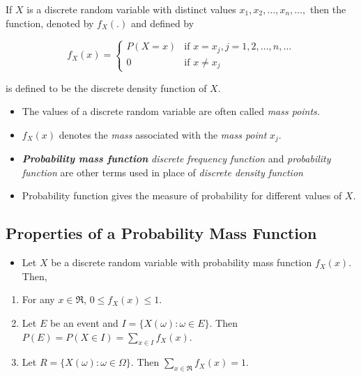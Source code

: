 \documentclass[]{book}
\providecommand{\tightlist}{%
  \setlength{\itemsep}{0pt}\setlength{\parskip}{0pt}}
\begin{document}
If \(X\) is a discrete random variable with distinct values \(x_1, x_2, \dots, x_n, \dots,\) then the function, denoted by \(f_X(.)\) and defined by

\begin{equation}
f_X(x) =
\begin{cases} 
P(X=x) & \text{if } x=x_j, j=1,2,\dots,n,\dots\\
0 & \text{if } x \neq x_j
\end{cases}
\end{equation}

is defined to be the discrete density function of \(X\).

\begin{itemize}
\tightlist
\item
  The values of a discrete random variable are often called \emph{mass points.}
\item
  \(f_X(x)\) denotes the \emph{mass} associated with the \emph{mass point} \(x_j\).
\item
  \textbf{\emph{Probability mass function}} \emph{discrete frequency function} and \emph{probability function} are other terms used in place of \emph{discrete density function}
\item
  Probability function gives the measure of probability for different values of \(X\).
\end{itemize}

\hypertarget{properties-of-a-probability-mass-function}{%
\subsection{Properties of a Probability Mass Function}\label{properties-of-a-probability-mass-function}}

\begin{itemize}
\tightlist
\item
  Let \(X\) be a discrete random variable with probability mass function \(f_X(x)\). Then,
\end{itemize}

\begin{enumerate}
\def\labelenumi{\arabic{enumi}.}
\tightlist
\item
  For any \(x\in \Re\), \(0\leq f_X(x) \leq 1.\)
\item
  Let \(E\) be an event and \(I= \{X(\omega):\omega \in E\}.\) Then \(P(E) = P(X\in I) = \sum_{x \in I}f_X(x).\)
\item
  Let \(R = \{X(\omega):\omega \in \Omega\}.\) Then \(\sum_{x\in \Re} f_X(x) = 1.\)
\end{enumerate}
\end{document}
